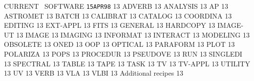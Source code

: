     {CURRENT \AIPS\ SOFTWARE%
}                    {{\tt 15APR98}\hskip 0.6cm 13}
  {ADVERB}                                      {13}
  {ANALYSIS}                                    {13}
  {AP}                                          {13}
  {ASTROMET}                                    {13}
  {BATCH}                                       {13}
  {CALIBRAT}                                    {13}
  {CATALOG}                                     {13}
  {COORDINA}                                    {13}
  {EDITING}                                     {13}
 {EXT-APPL}                                    {13}
 {FITS}                                        {13}
 {GENERAL}                                     {13}
 {HARDCOPY}                                    {13}
 {IMAGE-UT}                                    {13}
 {IMAGE}                                       {13}
 {IMAGING}                                     {13}
 {INFORMAT}                                    {13}
 {INTERACT}                                    {13}
 {MODELING}                                    {13}
 {OBSOLETE}                                    {13}
 {ONED}                                        {13}
 {OOP}                                         {13}
 {OPTICAL}                                     {13}
 {PARAFORM}                                    {13}
 {PLOT}                                        {13}
 {POLARIZA}                                    {13}
 {POPS}                                        {13}
 {PROCEDUR}                                    {13}
 {PSEUDOVE}                                    {13}
 {RUN}                                         {13}
 {SINGLEDI}                                    {13}
 {SPECTRAL}                                    {13}
 {TABLE}                                       {13}
 {TAPE}                                        {13}
 {TASK}                                        {13}
 {TV}                                          {13}
 {TV-APPL}                                     {13}
 {UTILITY}                                     {13}
 {UV}                                          {13}
 {VERB}                                        {13}
 {VLA}                                         {13}
 {VLBI}                                        {13}
 {Additional recipes}                          {13}

